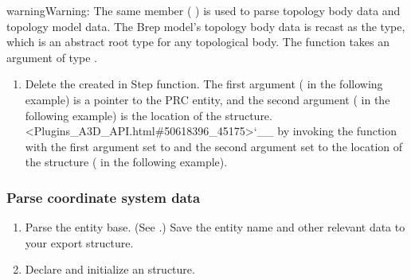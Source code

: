 \documentclass[letterpaper,12pt,english,openany,oneside]{sphinxmanual}
\begin{document}
\begin{sphinxadmonition}{warning}{Warning:}
The same member ( ) is used to parse topology body data and topology model data. The Brep model’s topology body data is recast as the  type, which is an abstract root type for any topological body. The  function takes an argument of type .
\end{sphinxadmonition}
\begin{enumerate}
%
\item {} 
Delete the  created in Step  function. The first argument ( in the following example) is a pointer to the PRC entity, and the second argument ( in the following example) is the location of the  structure. <Plugins\_A3D\_API.html\#50618396\_45175>`\_\_ by invoking the  function with the first argument set to  and the second argument set to the location of the structure ( in the following example).

\end{enumerate}

\begin{sphinxVerbatim}[commandchars=\\\{\}]
 
\end{sphinxVerbatim}


\subsubsection{Parse coordinate system data}
\label{\detokenize{Plugins_A3D_API:parse-coordinate-system-data}}\begin{enumerate}
%
\item {} 
Parse the entity base. (See .) Save the entity name and other relevant data to your export structure.

\item {} 
Declare and initialize an  structure.

\end{enumerate}
\end{document}
